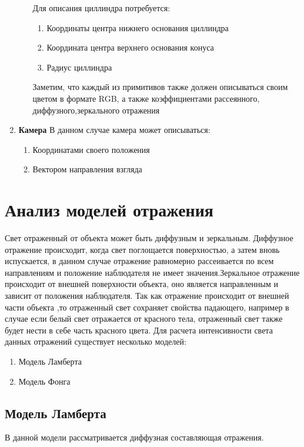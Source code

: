 \documentclass[a4paper,14pt, unknownkeysallowed]{extreport}
\begin{document}
\begin{enumerate}
\begin{enumerate}
		Для описания циллиндра потребуется:
		\begin{enumerate}
			\item Координаты центра нижнего основания циллиндра
			\item Координата центра верхнего основания конуса
			\item Радиус циллиндра
		\end{enumerate}
		Заметим, что каждый из примитивов также должен описываться своим цветом в формате RGB, а также
		коэффициентами рассеянного, диффузного,зеркального отражения
	\end{enumerate}

	\item \textbf{Камера}
	В данном случае камера может описываться:
	\begin{enumerate}
		\item Координатами своего положения
		\item Вектором направления взгляда
	\end{enumerate}
	
\end{enumerate}

\section[Анализ моделей отражения]{Анализ моделей отражения}
\label{sec:reflection_models}
Свет отраженный от объекта может быть диффузным и зеркальным.
Диффузное отражение происходит, когда свет поглощается поверхностью, а затем вновь испускается, в данном случае
отражение равномерно рассеивается по всем направлениям и положение наблюдателя не имеет значения.Зеркальное отражение
происходит от внешней поверхности объекта, оно является направленным и зависит от положения наблюдателя.
Так как отражение происходит от внешней части объекта ,то отраженный свет сохраняет свойства падающего, например в случае если белый свет отражается
от красного тела, отраженный свет также будет нести в себе часть красного цвета.
Для расчета интенсивности света данных отражений существует несколько моделей:\cite{Rodgers}
\begin{enumerate}
	\item Модель Ламберта
	\item Модель Фонга
\end{enumerate}

\subsection{Модель Ламберта}
В данной модели рассматривается диффузная составляющая отражения.
\end{document}
